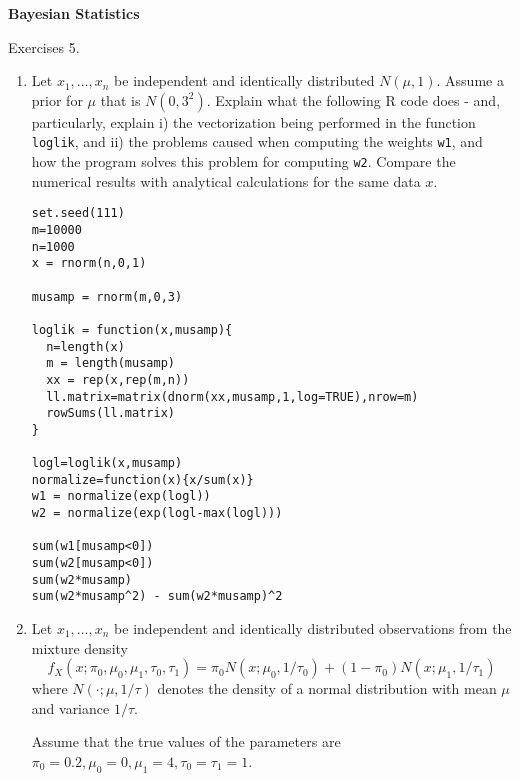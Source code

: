 \documentclass[12pt]{article}
\begin{document}
\begin{center}
{\bf
Bayesian Statistics

\smallskip

Exercises 5.
}
\smallskip

\end{center}

\bigskip

\begin{enumerate}

\item Let $x_1,\dots,x_n$ be independent and identically distributed $N(\mu,1)$. 
Assume a prior for $\mu$ that is $N(0,3^2)$.
Explain what the following R code does - and, particularly, explain i) the vectorization being performed in the function {\tt loglik},
and ii) the problems caused when computing the weights {\tt w1}, and how the program solves this problem for computing {\tt w2}.
Compare the numerical results with analytical calculations
for the same data $x$.
\begin{verbatim}
set.seed(111)
m=10000
n=1000
x = rnorm(n,0,1)

musamp = rnorm(m,0,3)

loglik = function(x,musamp){
  n=length(x)
  m = length(musamp)
  xx = rep(x,rep(m,n))
  ll.matrix=matrix(dnorm(xx,musamp,1,log=TRUE),nrow=m)
  rowSums(ll.matrix)
}

logl=loglik(x,musamp)
normalize=function(x){x/sum(x)}
w1 = normalize(exp(logl))
w2 = normalize(exp(logl-max(logl)))

sum(w1[musamp<0])
sum(w2[musamp<0])
sum(w2*musamp)
sum(w2*musamp^2) - sum(w2*musamp)^2
\end{verbatim}



\item Let $x_1,\dots,x_n$ be independent and identically distributed observations from the mixture
density
\begin{equation} \label{eqn:mix}
f_X(x; \pi_0, \mu_0,\mu_1,\tau_0,\tau_1) = \pi_0 N(x; \mu_0, 1/\tau_0) + (1-\pi_0) N(x; \mu_1,1/\tau_1)
\end{equation}
where $N(\cdot; \mu,1/\tau)$ denotes the density of a normal distribution with mean $\mu$ and variance $1/\tau$. 

Assume that the true values of the parameters are $\pi_0= 0.2, \mu_0 = 0, \mu_1 = 4, \tau_0=\tau_1=1$. 


\end{enumerate}
\end{document}

